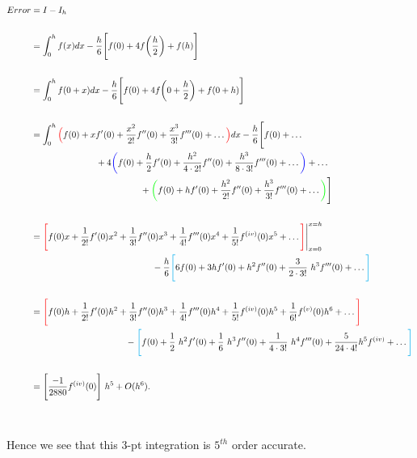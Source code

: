 \documentclass[paper=a4, fontsize=11pt]{scrartcl} %
\numberwithin{equation}{section} %
\numberwithin{figure}{section} %
\numberwithin{table}{section} %
\begin{document}
\begin{enumerate}
\begin{align}
\nonumber
\begin{split}
Error &= I - I_h \\ \\
	&= \int_0^h f(x) dx -  \frac{h}{6} \Bigg[ f(0) + 4 f\bigg(\frac{h}{2} \bigg) + f(h) \Bigg] \\ \\
	&= \int_0^h f(0+x) dx - \frac{h}{6} \Bigg[ f(0) + 4f\bigg(0+\frac{h}{2}\bigg) + f(0+h)\Bigg] \\ \\
	&=\int_0^h \textcolor{red}{\Big(} f(0) + xf'(0) +\frac{x^2}{2!} f''(0) + \frac{x^3}{3!} f'''(0) +\ldots \textcolor{red}{\Big)}dx - \frac{h}{6} \Bigg[ f(0) +\ldots \\
	&\ \ \ \ \ \ \ \ \ \ \ \ \ \ \ \ \ \ \ \ \ \ +4 \textcolor{blue}{\bigg(} f(0) + \frac{h}{2} f'(0) +\frac{h^2}{4\cdot2!} f''(0) + \frac{h^3}{8\cdot3!} f'''(0) +\ldots \textcolor{blue}{\bigg)} + \ldots \\
	&\ \ \ \ \ \ \ \ \ \ \ \ \ \ \ \ \ \ \ \ \ \ \ \ \ \ \ \ \ \ \ \ \ \ \ \ \  +\textcolor{green}{\bigg(} f(0) + hf'(0) + \frac{h^2}{2!} f''(0) + \frac{h^3}{3!} f'''(0) +\ldots \textcolor{green}{\bigg)} \Bigg]\\ \\ 
	&=\textcolor{red}{\Bigg[} f(0)x + \frac{1}{2!}f'(0)x^2 + \frac{1}{3!}f''(0)x^3+ \frac{1}{4!} f'''(0) x^4 + \frac{1}{5!} f^{(iv)}(0) x^5 + \ldots \textcolor{red}{\Bigg]}\Bigg|_{x=0}^{x=h}\\  
	&\ \ \ \ \ \ \ \ \ \ \ \ \ \ \ \ \ \ \ \ \ \ \ \ \ \ \ \ \ \ \ \ \ \ \ \ \ \ \ \  \ -\frac{h}{6} \textcolor{cyan}{\Bigg[} 6f(0) + 3h f'(0) + h^2 f''(0)  + \frac{3}{2\cdot3!}\ h^3 f'''(0) +\ldots \textcolor{cyan}{\Bigg]}  \\ \\
	&=\textcolor{red}{\Bigg[} f(0)h + \frac{1}{2!}f'(0)h^2 + \frac{1}{3!}f''(0)h^3+ \frac{1}{4!} f'''(0) h^4 + \frac{1}{5!} f^{(iv)}(0) h^5 + \frac{1}{6!} f^{(v)}(0) h^6 +\ldots \textcolor{red}{\Bigg]}  \\  
	&\ \ \ \ \ \ \ \ \ \ \ \ \ \ \ \ \ \ \ \ \ \ \ \ \ \ \ \ \ \ \ \  - \textcolor{cyan}{\Bigg[} f(0) + \frac{1}{2}\ h^2 f'(0) + \frac{1}{6}\ h^3 f''(0)  + \frac{1}{4\cdot3!}\ h^4 f'''(0) + \frac{5}{24\cdot 4!} h^5 f^{(iv)} +\ldots \textcolor{cyan}{\Bigg]}  \\ \\
	&=\Bigg[\frac{-1}{2880}f^{(iv)}(0)\Bigg]\ h^5 + O(h^6).\\ \\
\end{split}
\end{align}\\

Hence we see that this $3$-pt integration is $5^{th}$ order accurate. 

\end{enumerate}
\end{document}
